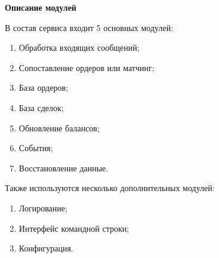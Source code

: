 \textbf{Описание модулей}

В состав сервиса входит 5 основных модулей:


\begin{enumerate}
    \item Обработка входящих сообщений;
    \item Сопоставление ордеров или матчинг;
    \item База ордеров;
    \item База сделок;
    \item Обновление балансов;
    \item События;
    \item Восстановление данные.
\end{enumerate}

Также используются несколько дополнительных модулей:


\begin{enumerate}
    \item Логирование;
    \item Интерфейс командной строки;
    \item Конфигурация.
\end{enumerate}

